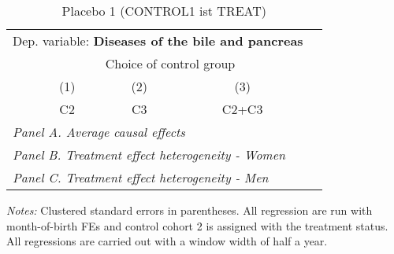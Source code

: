  \begin{table}[H] \centering \begin{threeparttable} \caption{Placebo 1 (CONTROL1 ist TREAT) } {\def\sym#1{\ifmmode^{#1}\else\(^{#1}\)\fi} \begin{tabular}{l*{4}{c}} \toprule \multicolumn{4}{l}{Dep. variable: \textbf{Diseases of the bile and pancreas}} \\ & \multicolumn{3}{c}{Choice of control group} \\ \cmidrule(lr){2-4}
            &\multicolumn{1}{c}{(1)}&\multicolumn{1}{c}{(2)}&\multicolumn{1}{c}{(3)}\\
            &\multicolumn{1}{c}{C2}&\multicolumn{1}{c}{C3}&\multicolumn{1}{c}{C2+C3}\\
\midrule
 \multicolumn{4}{l}{\emph{Panel A. Average causal effects}} \\      \midrule\multicolumn{4}{l}{\emph{Panel B. Treatment effect heterogeneity - Women}} \\      \midrule\multicolumn{4}{l}{\emph{Panel C. Treatment effect heterogeneity - Men}} \\      
\bottomrule \end{tabular} } \begin{tablenotes} \item \scriptsize \emph{Notes:} Clustered standard errors in parentheses. All regression are run with month-of-birth FEs and control cohort 2 is assigned with the treatment status. All regressions are carried out with a window width of half a year. \end{tablenotes} \end{threeparttable} \end{table} 
